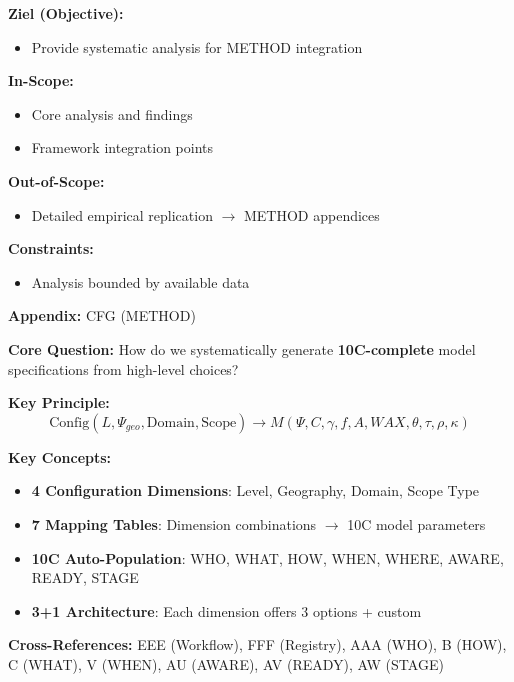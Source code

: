 \begin{tcolorbox}[
    colback=orange!5!white,
    colframe=orange!75!black,
    title={\textbf{Appendix Scope: Ziel / In-Scope / Out-of-Scope / Constraints}},
    fonttitle=\bfseries
]

\textbf{Ziel (Objective):}
\begin{itemize}[nosep]
    \item Provide systematic analysis for METHOD integration
\end{itemize}

\textbf{In-Scope:}
\begin{itemize}[nosep]
    \item Core analysis and findings
    \item Framework integration points
\end{itemize}

\textbf{Out-of-Scope:}
\begin{itemize}[nosep]
    \item Detailed empirical replication $\rightarrow$ METHOD appendices
\end{itemize}

\textbf{Constraints:}
\begin{itemize}[nosep]
    \item Analysis bounded by available data
\end{itemize}

\end{tcolorbox}

\begin{tcolorbox}[colback=blue!5!white, colframe=blue!75!black,
    title=Quick Reference: Model Configurator (10C Complete)]
\textbf{Appendix:} CFG (METHOD)


\textbf{Core Question:} How do we systematically generate \textbf{10C-complete} model specifications from high-level choices?

\textbf{Key Principle:}
\begin{equation}
\text{Config}(L, \Psi_{geo}, \text{Domain}, \text{Scope}) \rightarrow M(\Psi, C, \gamma, f, A, WAX, \theta, \tau, \rho, \kappa)
\end{equation}

\textbf{Key Concepts:}
\begin{itemize}[nosep]
\item \textbf{4 Configuration Dimensions}: Level, Geography, Domain, Scope Type
\item \textbf{7 Mapping Tables}: Dimension combinations $\rightarrow$ 10C model parameters
\item \textbf{10C Auto-Population}: WHO, WHAT, HOW, WHEN, WHERE, AWARE, READY, STAGE
\item \textbf{3+1 Architecture}: Each dimension offers 3 options + custom
\end{itemize}

\textbf{Cross-References:} EEE (Workflow), FFF (Registry), AAA (WHO), B (HOW), C (WHAT), V (WHEN), AU (AWARE), AV (READY), AW (STAGE)
\end{tcolorbox}



